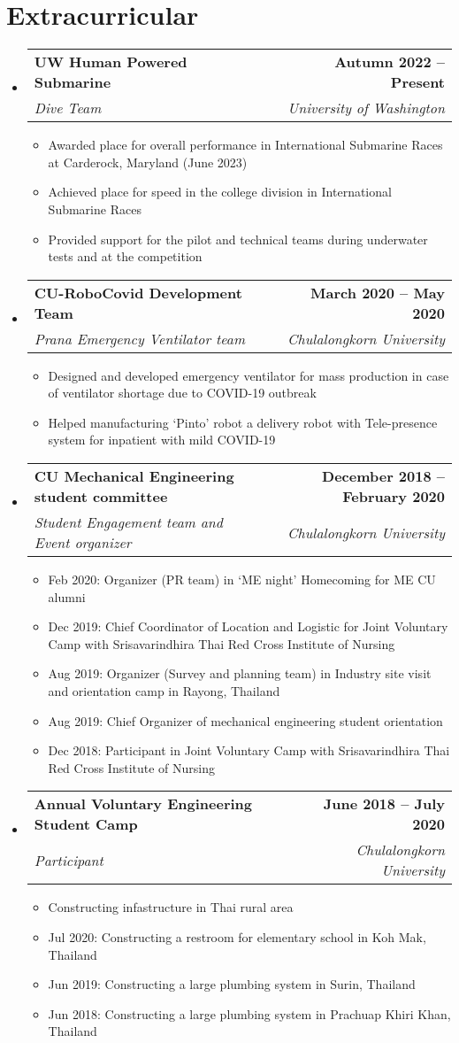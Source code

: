 \documentclass[letterpaper,11pt]{article}
\makeatletter
\newcommand{\resumeItem}[1]{
  \item\small{
    {#1 \vspace{-2pt}}
  }
}
\newcommand{\resumeSubheading}[4]{
  \vspace{-2pt}\item
    \begin{tabular*}{1.0\textwidth}[t]{l@{\extracolsep{\fill}}r}
      \textbf{#1} & \textbf{\small #2} \\
      \textit{\small#3} & \textit{\small #4} \\
    \end{tabular*}\vspace{-7pt}
}
\newcommand{\resumeSubHeadingListStart}{\begin{itemize}[leftmargin=0.0in, label={}]}
\newcommand{\resumeSubHeadingListEnd}{\end{itemize}}
\newcommand{\resumeItemListStart}{\begin{itemize}}
\newcommand{\resumeItemListEnd}{\end{itemize}\vspace{-5pt}}
\makeatother
\begin{document}
\section{Extracurricular}
    \resumeSubHeadingListStart
        \resumeSubheading{UW Human Powered Submarine}{Autumn 2022 -- Present}{Dive Team}{University of Washington}
            \resumeItemListStart
                \resumeItem{Awarded  place for overall performance in \nth{17} International Submarine Races at Carderock, Maryland (June 2023)}
                \resumeItem{Achieved  place for speed in the college division in \nth{17} International Submarine Races}
                \resumeItem{Provided support for the pilot and technical teams during underwater tests and at the competition}
            \resumeItemListEnd
            \resumeSubheading{CU-RoboCovid Development Team}{March 2020 -- May 2020}{Prana Emergency Ventilator team}{Chulalongkorn University}
                \resumeItemListStart
                    \resumeItem{Designed and developed emergency ventilator for mass production in case of ventilator shortage due to COVID-19 outbreak}
                    \resumeItem{Helped manufacturing `Pinto' robot a delivery robot with Tele-presence system for inpatient with mild COVID-19}
                \resumeItemListEnd
            \resumeSubheading{CU Mechanical Engineering student committee}{December 2018 -- February 2020}{Student Engagement team and Event organizer}{Chulalongkorn University}
            \resumeItemListStart
                \resumeItem{Feb 2020: Organizer (PR team) in `ME night'  Homecoming for ME CU alumni}
                \resumeItem{Dec 2019: Chief Coordinator of Location and Logistic for \nth{2} Joint Voluntary Camp with Srisavarindhira Thai Red Cross Institute of Nursing}
                \resumeItem{Aug 2019: Organizer (Survey and planning team) in Industry site visit and orientation camp in Rayong, Thailand}
                \resumeItem{Aug 2019: Chief Organizer of mechanical engineering student orientation}
                \resumeItem{Dec 2018: Participant in  Joint Voluntary Camp with Srisavarindhira Thai Red Cross Institute of Nursing}
            \resumeItemListEnd
            \resumeSubheading{Annual Voluntary Engineering Student Camp}{June 2018 -- July 2020}{Participant}{Chulalongkorn University}
                \resumeItemListStart
                    \resumeItem{Constructing infastructure in Thai rural area}
                    \resumeItem{Jul 2020: Constructing a restroom for elementary school in Koh Mak, Thailand}
                    \resumeItem{Jun 2019: Constructing a large plumbing system in Surin, Thailand}
                    \resumeItem{Jun 2018: Constructing a large plumbing system in Prachuap Khiri Khan, Thailand}
                \resumeItemListEnd
        
    \resumeSubHeadingListEnd
\end{document}
